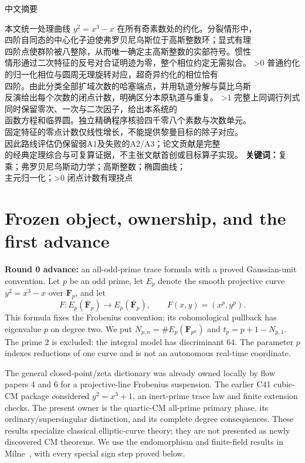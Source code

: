 \documentclass[10pt]{article}
\newcommand{\F}{\mathbf F}
\begin{document}
\begin{center}{\zhfont\large 中文摘要}\end{center}
{\zhfont\begin{flushleft}
本文统一处理曲线 $y^2=x^3-x$ 在所有奇素数处的约化。分裂情形中，\\
四阶自同态的中心化子迫使弗罗贝尼乌斯位于高斯整数环；显式有理\\
四阶点使群阶被八整除，从而唯一确定主高斯整数的实部符号。惯性\\
情形通过二次特征的反号对合证明迹为零，整个相位约定无需拟合。
\ifnum\CRevisionRound>0
普通约化的归一化相位与圆周无理旋转对应，超奇异约化的相位恰有\\
四阶。由此分类全部扩域次数的哈塞端点，并用轨道分解与莫比乌斯\\
反演给出每个次数的闭点计数，明确区分本原轨道与重复。
\fi
\ifnum\CRevisionRound>1
完整上同调行列式同时保留零次、一次与二次因子，给出本系统的\\
函数方程和临界圆。独立精确程序核验四千零八个素数与次数单元。\\
固定特征的零点计数仅线性增长，不能提供黎曼目标的除子对应。\\
因此路线评估仍保留弱{\normalfont A1}及失败的{\normalfont A2/A3}；论文贡献是完整\\
的经典定理综合与可复算证据，不主张文献首创或目标算子实现。
\fi
\textbf{关键词：}复乘；弗罗贝尼乌斯动力学；高斯整数；椭圆曲线；\\
主元归一化；\ifnum\CRevisionRound>0 闭点计数\else 有理挠点\fi
\end{flushleft}}

\section{Frozen object, ownership, and the first advance}
\textbf{Round 0 advance:} an all-odd-prime trace formula with a proved
Gaussian-unit convention. Let $p$ be an odd prime, let $E_p$ denote the
smooth projective curve $y^2=x^3-x$ over $\F_p$, and let
\[
 F:E_p(\overline{\F}_p)\longrightarrow E_p(\overline{\F}_p),
 \qquad F(x,y)=(x^p,y^p).
\]
This formula fixes the Frobenius convention; its cohomological pullback
has eigenvalue $p$ on degree two. We put
$N_{p,n}=\#E_p(\F_{p^n})$ and $t_p=p+1-N_{p,1}$.
The prime $2$ is excluded: the integral model has discriminant $64$.
The parameter $p$ indexes reductions of one curve and is not an
autonomous real-time coordinate.

The general closed-point/zeta dictionary was already owned locally by
flow papers 4 and 6 for a projective-line Frobenius suspension. The
earlier C41 cubic-CM package considered $y^2=x^3+1$, an inert-prime trace
law and finite extension checks. The present owner is the quartic-CM
all-prime primary phase, its ordinary/supersingular distinction, and its
complete degree consequences. These results specialize classical
elliptic-curve theory; they are not presented as newly discovered CM
theorems. We use the endomorphism and finite-field results in
Milne~\cite{Milne}, with every special sign step proved below.
\end{document}
